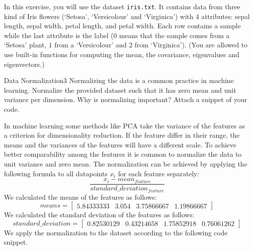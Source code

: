 \newif\ifvimbug
\vimbugfalse

\ifvimbug

\fi

In this exercise, you will use the dataset \texttt{iris.txt}. It contains data from three kind of Iris flowers (`Setosa', `Versicolour' and `Virginica') with 4 attributes: sepal length, sepal width, petal length, and petal width. Each row contains a sample while the last attribute is the label ($0$ means that the sample comes from a `Setosa' plant, $1$ from a `Versicolour' and $2$ from `Virginica').
(You are allowed to use built-in functions for computing the mean, the covariance, eigenvalues and eigenvectors.)

\begin{questions}


\begin{question}{Data Normalization}{3}
Normalizing the data is a common practice in machine learning. Normalize the provided dataset such that it has zero mean and unit variance per dimension. Why is normalizing important?
Attach a snippet of your code. 

\begin{answer}
In machine learning some methods like PCA take the variance of the features as a criterion for dimensionality reduction. If the feature differ in their range, the means and the variances of the features will have a different scale. To achieve better comparability among the features it is common to normalize the data to unit variance and zero mean. The normalization can be achieved by applying the following formula to all datapoints $x_i$ for each feature separately:
\begin{equation*}
\frac{x_i-mean_{feature}}{standard\_deviation_{feature}}
\end{equation*}
We calculated the means of the features as follows:
$$means=\begin{bmatrix} 
5.84333333 & 3.054 & 3.75866667 &1.19866667
\end{bmatrix}$$
We calculated the standard deviation of the features as follows:
$$standard\_deviation=\begin{bmatrix} 
0.82530129 & 0.43214658 & 1.75852918 & 0.76061262
\end{bmatrix}$$
We apply the normalization to the dataset according to the following code snippet.\\

\end{answer}


\end{question}
\end{questions}
